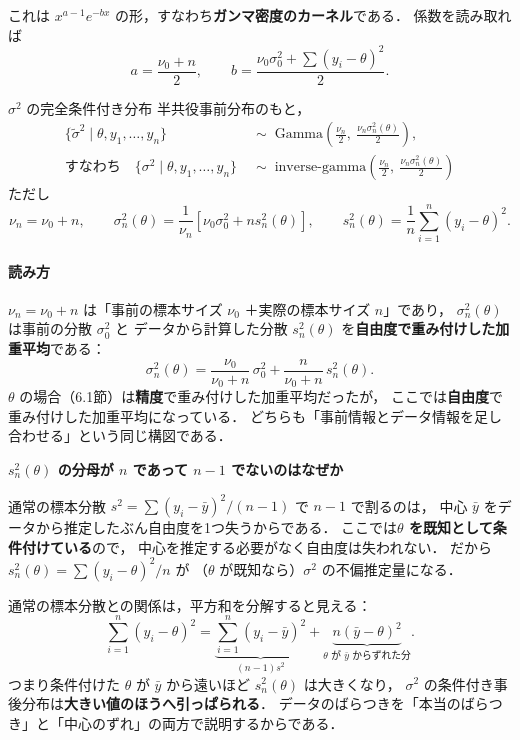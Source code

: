 \documentclass[lualatex,ja=standard,a4paper,12pt]{bxjsarticle}
\begin{document}
\medskip
これは $x^{a-1}e^{-bx}$ の形，すなわち\textbf{ガンマ密度のカーネル}である．
係数を読み取れば
\[
  a = \frac{\nu_0 + n}{2},
  \qquad
  b = \frac{\nu_0\sigma_0^2 + \sum (y_i - \theta)^2}{2}.
\]

\begin{thmbox}{$\sigma^2$ の完全条件付き分布}
半共役事前分布のもと，
\begin{align*}
  \{\tilde{\sigma}^2 \mid \theta, y_1, \ldots, y_n\}
    &\;\sim\; \mathrm{Gamma}\!\left(\frac{\nu_n}{2},\ \frac{\nu_n \sigma_n^2(\theta)}{2}\right), \\[4pt]
  \text{すなわち}\quad
  \{\sigma^2 \mid \theta, y_1, \ldots, y_n\}
    &\;\sim\; \mathrm{inverse\text{-}gamma}\!\left(\frac{\nu_n}{2},\ \frac{\nu_n \sigma_n^2(\theta)}{2}\right)
\end{align*}
ただし
\[
  \nu_n = \nu_0 + n,
  \qquad
  \sigma_n^2(\theta) = \frac{1}{\nu_n}\left[\nu_0 \sigma_0^2 + n s_n^2(\theta)\right],
  \qquad
  s_n^2(\theta) = \frac{1}{n}\sum_{i=1}^{n} (y_i - \theta)^2.
\]
\end{thmbox}

\paragraph{読み方}
$\nu_n = \nu_0 + n$ は「事前の標本サイズ $\nu_0$ ＋実際の標本サイズ $n$」であり，
$\sigma_n^2(\theta)$ は事前の分散 $\sigma_0^2$ と
データから計算した分散 $s_n^2(\theta)$ を\textbf{自由度で重み付けした加重平均}である：
\[
  \sigma_n^2(\theta) = \frac{\nu_0}{\nu_0 + n}\,\sigma_0^2
    + \frac{n}{\nu_0 + n}\, s_n^2(\theta).
\]
$\theta$ の場合（6.1節）は\textbf{精度}で重み付けした加重平均だったが，
ここでは\textbf{自由度}で重み付けした加重平均になっている．
どちらも「事前情報とデータ情報を足し合わせる」という同じ構図である．

\begin{pointbox}
\textbf{$s_n^2(\theta)$ の分母が $n$ であって $n-1$ でないのはなぜか}

通常の標本分散 $s^2 = \sum(y_i - \bar{y})^2/(n-1)$ で $n-1$ で割るのは，
中心 $\bar{y}$ をデータから推定したぶん自由度を1つ失うからである．
ここでは\textbf{$\theta$ を既知として条件付けている}ので，
中心を推定する必要がなく自由度は失われない．
だから $s_n^2(\theta) = \sum(y_i - \theta)^2/n$ が
（$\theta$ が既知なら）$\sigma^2$ の不偏推定量になる．

\medskip
通常の標本分散との関係は，平方和を分解すると見える：
\[
  \sum_{i=1}^{n}(y_i - \theta)^2
  = \underbrace{\sum_{i=1}^{n}(y_i - \bar{y})^2}_{(n-1)s^2}
  + \underbrace{n(\bar{y} - \theta)^2}_{\theta \text{ が } \bar{y} \text{ からずれた分}}.
\]
つまり条件付けた $\theta$ が $\bar{y}$ から遠いほど $s_n^2(\theta)$ は大きくなり，
$\sigma^2$ の条件付き事後分布は\textbf{大きい値のほうへ引っぱられる}．
データのばらつきを「本当のばらつき」と「中心のずれ」の両方で説明するからである．
\end{pointbox}
\end{document}

